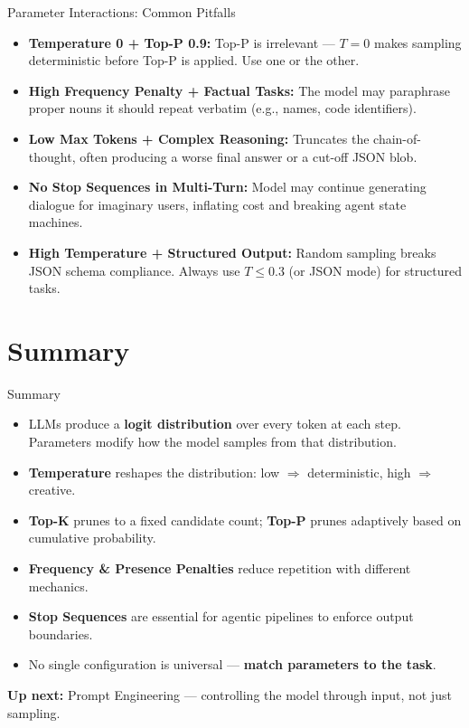 \documentclass{beamer}
\begin{document}
\begin{frame}{Parameter Interactions: Common Pitfalls}
    \begin{itemize}
        \item \textbf{Temperature 0 + Top-P 0.9:} Top-P is irrelevant --- $T=0$ makes sampling
              deterministic before Top-P is applied. Use one or the other.
        \item \textbf{High Frequency Penalty + Factual Tasks:} The model may paraphrase proper nouns
              it should repeat verbatim (e.g., names, code identifiers).
        \item \textbf{Low Max Tokens + Complex Reasoning:} Truncates the chain-of-thought, often
              producing a worse final answer or a cut-off JSON blob.
        \item \textbf{No Stop Sequences in Multi-Turn:} Model may continue generating dialogue for
              imaginary users, inflating cost and breaking agent state machines.
        \item \textbf{High Temperature + Structured Output:} Random sampling breaks JSON schema
              compliance. Always use $T \leq 0.3$ (or JSON mode) for structured tasks.
    \end{itemize}
\end{frame}

\section{Summary}
\begin{frame}{Summary}
    \begin{itemize}
        \item LLMs produce a \textbf{logit distribution} over every token at each step.
              Parameters modify how the model samples from that distribution.
        \item \textbf{Temperature} reshapes the distribution:
              low $\Rightarrow$ deterministic, high $\Rightarrow$ creative.
        \item \textbf{Top-K} prunes to a fixed candidate count;
              \textbf{Top-P} prunes adaptively based on cumulative probability.
        \item \textbf{Frequency \& Presence Penalties} reduce repetition with different mechanics.
        \item \textbf{Stop Sequences} are essential for agentic pipelines to enforce output boundaries.
        \item No single configuration is universal --- \textbf{match parameters to the task}.
    \end{itemize}

    \vspace{0.2cm}
    \textbf{Up next:} Prompt Engineering --- controlling the model through input, not just sampling.
\end{frame}
\end{document}

